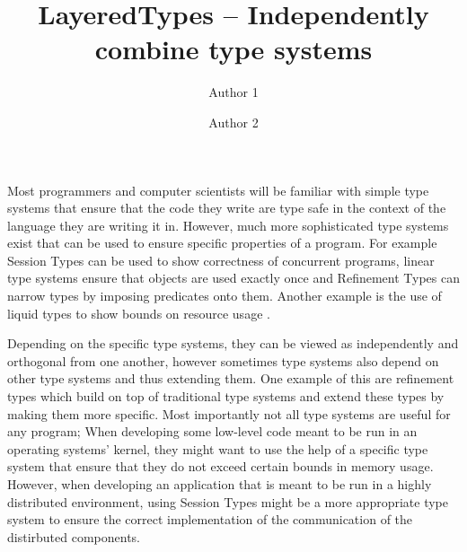 \documentclass{easychair}
\title{LayeredTypes -- Independently combine type systems}
\author{
Author 1\inst{1}
\and
Author 2\inst{2}
}
\institute{
  Institute 1,
  Location 1\\
  \email{mail1}
\and
   Intitute 2,
   Location 2\\
   \email{mail2}\\
}
\begin{document}
\maketitle





%
%

\label{sec:context}
Most programmers and computer scientists will be familiar with simple type systems that ensure that the code they write are type safe in the context of the language they are writing it in. However, much more sophisticated type systems exist that can be used to ensure specific properties of a program. For example Session Types \cite{session} can be used to show correctness of concurrent programs, linear type systems \cite{linear} ensure that objects are used exactly once and Refinement Types \cite{refinement} can narrow types by imposing predicates onto them. Another example is the use of liquid types to show bounds on resource usage \cite{liquidate-assets}.

Depending on the specific type systems, they can be viewed as independently and orthogonal from one another, however sometimes type systems also depend on other type systems and thus extending them. One example of this are refinement types which build on top of traditional type systems and extend these types by making them more specific. Most importantly not all type systems are useful for any program; When developing some low-level code meant to be run in an operating systems' kernel, they might want to use the help of a specific type system that ensure that they do not exceed certain bounds in memory usage. However, when developing an application that is meant to be run in a highly distributed environment, using Session Types might be a more appropriate type system to ensure the correct implementation of the communication of the distirbuted components.
\end{document}

